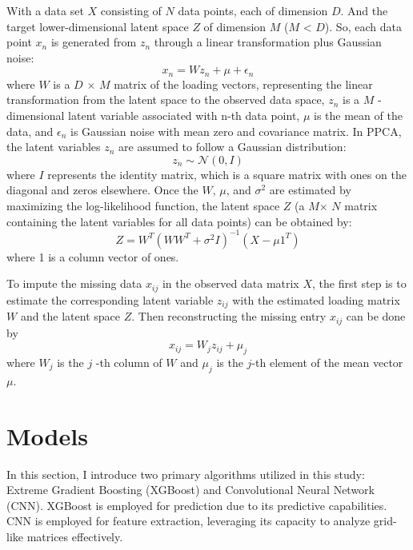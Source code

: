 \documentclass[12pt,a4paper,english
]{tunithesis}
\begin{document}
With a data set $X$ consisting of $N$ data points, each of dimension $D$. And the target lower-dimensional latent space $Z$ of dimension $M$ ($M$ < $D$). So, each data point $x_n$ is generated from $z_n$ through a linear transformation plus Gaussian noise:
\begin{equation}
    {x_n} = {W}{z_n}+{\mu}+{\epsilon _n}
\end{equation}
where $W$ is a $D$ $\times$ $M$ matrix of the loading vectors, representing the linear transformation from the latent space to the observed data space, $z_n$ is a $M$ -dimensional latent variable associated with n-th data point, $\mu$ is the mean of the data, and $\epsilon _n$ is Gaussian noise with mean zero and covariance matrix.
In PPCA, the latent variables $z_n$ are assumed to follow a Gaussian distribution:
\begin{equation}
    {z_n} \sim {\mathcal{N}}(0, {I})
\end{equation}
where $I$ represents the identity matrix, which is a square matrix with ones on the diagonal and zeros elsewhere. Once the $W$, $\mu$, and $\sigma ^2$ are estimated by maximizing the log-likelihood function, the latent space $Z$ (a $M$$\times$ $N$ matrix containing the latent variables for all data points) can be obtained by:
\begin{equation}
    {Z} = {W^T}{({W}{W^T}+{\sigma ^2}{I})^{-1}}({X}-{\mu}{1^T})
\end{equation}
where 1 is a column vector of ones.

To impute the missing data $x_{ij}$ in the observed data matrix $X$, the first step is to estimate the corresponding latent variable $z_{ij}$ with the estimated loading matrix $W$ and the latent space $Z$. Then reconstructing the missing entry  $x_{ij}$ can be done by
\begin{equation}
    {x_{ij}} = {W_j}{z_{ij}}+{\mu _j}
\end{equation}
where $W_j$ is the $j$ -th column of $W$ and $\mu_j$ is the $j$-th element of the mean vector $\mu$.


\section{Models}
In this section, I introduce two primary algorithms utilized in this study: Extreme Gradient Boosting (XGBoost) and Convolutional Neural Network (CNN). XGBoost is employed for prediction due to its predictive capabilities. CNN is employed for feature extraction, leveraging its capacity to analyze grid-like matrices effectively.
\end{document}

